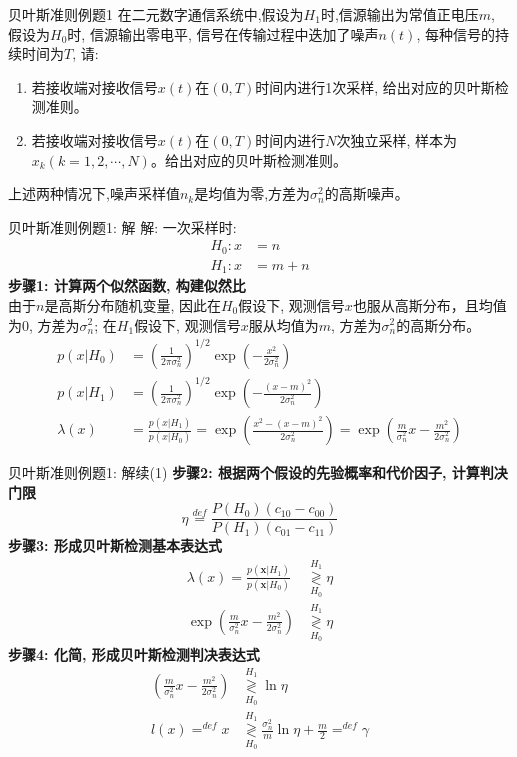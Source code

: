 \begin{frame}{贝叶斯准则例题1}
在二元数字通信系统中,假设为$H_1$时,信源输出为常值正电压$m$, 假设为$H_0$时, 信源输出零电平, 信号在传输过程中迭加了噪声$n(t)$, 每种信号的持续时间为$T$, 请:
\begin{enumerate}
	\item 若接收端对接收信号$x(t)$在$(0,T)$时间内进行1次采样, 给出对应的贝叶斯检测准则。
	\item 若接收端对接收信号$x(t)$在$(0,T)$时间内进行$N$次独立采样, 样本为$x_k(k=1,2,\cdots,N)$。给出对应的贝叶斯检测准则。
\end{enumerate}
上述两种情况下,噪声采样值$n_k$是均值为零,方差为$\sigma_n^2$的高斯噪声。
\end{frame}

\begin{frame}[shrink]{贝叶斯准则例题1: 解}
解: 一次采样时:
\begin{align*}
H_0: x&=n\\
H_1: x&=m+n
\end{align*}
\textbf{步骤1: 计算两个似然函数, 构建似然比}\\
由于$n$是高斯分布随机变量, 因此在$H_0$假设下, 观测信号$x$也服从高斯分布，且均值为0, 方差为$\sigma_n^2$; 在$H_1$假设下, 观测信号$x$服从均值为$m$, 方差为$\sigma_n^2$的高斯分布。
\begin{align*}
p(x|H_0)&=\left(\frac{1}{2\pi\sigma_n^2}\right)^{1/2}\exp\left(-\frac{x^2}{2\sigma_n^2}\right)\\
p(x|H_1)&=\left(\frac{1}{2\pi\sigma_n^2}\right)^{1/2}\exp\left(-\frac{(x-m)^2}{2\sigma_n^2}\right)\\
\lambda(x)&=\frac{p(x|H_1)}{p(x|H_0)}=\exp\left(\frac{x^2-(x-m)^2}{2\sigma_n^2}\right)=\exp\left(\frac{m}{\sigma_n^2}x-\frac{m^2}{2\sigma_n^2}\right)
\end{align*} 
\end{frame}

\begin{frame}[shrink]{贝叶斯准则例题1: 解续(1)}
\textbf{步骤2: 根据两个假设的先验概率和代价因子, 计算判决门限}
\[\eta\mathop{=}\limits^{def}\frac{P(H_0)(c_{10}-c_{00})}{P(H_1)(c_{01}-c_{11})} \]
\textbf{步骤3: 形成贝叶斯检测基本表达式}
\begin{align*}
\lambda(x)=\frac{p(\bm{x}|H_1)}{p(\bm{x}|H_0)}&\mathop{\gtrless}\limits_{H_0}^{H_1}\eta\\
\exp\left(\frac{m}{\sigma_n^2}x-\frac{m^2}{2\sigma_n^2}\right)&\mathop{\gtrless}\limits_{H_0}^{H_1}\eta
\end{align*} 
\textbf{步骤4: 化简, 形成贝叶斯检测判决表达式}
\begin{align*}
\left(\frac{m}{\sigma_n^2}x-\frac{m^2}{2\sigma_n^2}\right)&\mathop{\gtrless}\limits_{H_0}^{H_1}\ln\eta\\
l(x)\mathop{=}^{def}x&\mathop{\gtrless}\limits_{H_0}^{H_1}\frac{\sigma_n^2}{m}\ln\eta+\frac{m}{2}\mathop{=}^{def}\gamma\\
\end{align*} 
\end{frame}

